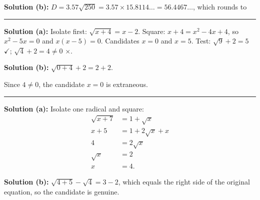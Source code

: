 \documentclass[12pt]{article}
\begin{document}
\textbf{Solution (b):} $D = 3.57\sqrt{250} = 3.57 \times 15.8114\ldots
= 56.4467\ldots$, which rounds to 

\vspace{0.2cm}\noindent\rule{\linewidth}{0.2pt}\vspace{0.2cm}


\textbf{Solution (a):} Isolate first: $\sqrt{x+4} = x - 2$. Square:
$x + 4 = x^2 - 4x + 4$, so $x^2 - 5x = 0$ and $x(x-5) = 0$. Candidates $x = 0$
and $x = 5$. Test: $\sqrt{9} + 2 = 5$ $\checkmark$; $\sqrt{4} + 2 = 4 \ne 0$
$\times$. 

\textbf{Solution (b):} $\sqrt{0+4} + 2 = 2 + 2$. 

Since $4 \ne 0$, the candidate $x = 0$ is extraneous.

\vspace{0.2cm}\noindent\rule{\linewidth}{0.2pt}\vspace{0.2cm}


\textbf{Solution (a):} Isolate one radical and square:
\begin{align*}
  \sqrt{x+7} &= 1 + \sqrt{x} \\
  x + 5 &= 1 + 2\sqrt{x} + x \\
  4 &= 2\sqrt{x} \\
  \sqrt{x} &= 2 \\
  x &= 4 .
\end{align*}

\textbf{Solution (b):} $\sqrt{4+5} - \sqrt{4} = 3 - 2$, which equals the right
side of the original equation, so the candidate is genuine.
\end{document}
